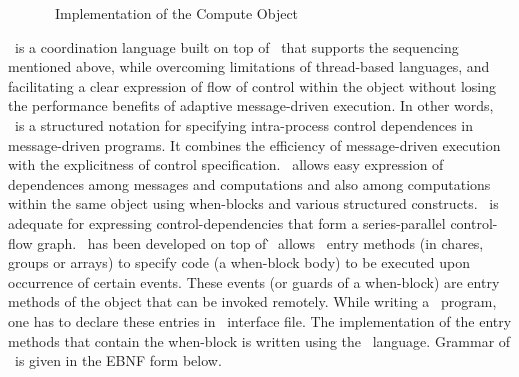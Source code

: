 \begin{figure}
\begin{center}
\end{center}
\caption{\sdag\ Implementation of the Compute Object}
\label{figsdagexample}
\end{figure}

\sdag\ is a coordination language built on top of
\charmpp\ that supports the sequencing mentioned above,
while overcoming limitations of thread-based languages, and
facilitating a clear expression of flow of control within the object
without losing the performance benefits of adaptive message-driven
execution.  In other words, \sdag\ is a structured notation for
specifying intra-process control dependences in message-driven
programs. It combines the efficiency of message-driven execution with
the explicitness of control specification. \sdag\ allows easy
expression of dependences among messages and computations and also
among computations within the same object using when-blocks and
various structured constructs.  \sdag\ is adequate for expressing
control-dependencies that form a series-parallel control-flow graph.
\sdag\ has been developed on top of \charmpp\. \sdag\ allows
\charmpp\ entry methods (in chares, groups or arrays) to specify
code (a when-block body) to be executed upon occurrence of certain events. 
These events (or guards of a when-block) are entry methods of the object that
can be invoked remotely. While writing a \sdag\ program, one has to declare these
entries in \charmpp\ interface file. The implementation of the
entry methods that contain the when-block is written using the \sdag\
language. Grammar of \sdag\ is given in the EBNF form below.

